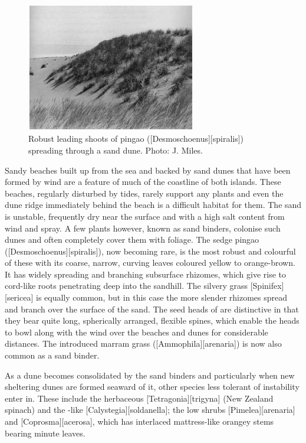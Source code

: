 \begin{figure}
	\includegraphics[width=0.66\textwidth]{graphics/figure88pingao.jpg}
	\centering
	\caption[Robust leading shoots of pingao]{Robust leading shoots of pingao ([Desmoschoenus][spiralis]) spreading through a sand dune.
	Photo: J. Miles.}%
	\label{fig:88pingao}
\end{figure}

Sandy beaches built up from the sea and backed by sand dunes that have been formed by wind are a feature of much of the coastline of both islands.
These beaches, regularly disturbed by tides, rarely support any plants and even the dune ridge immediately behind the beach is a difficult habitat for them.
The sand is unstable, frequently dry near the surface and with a high salt content from wind and spray.
A few plants however, known as sand binders, colonise such dunes and often completely cover them with foliage.
The sedge pingao ([Desmoschoenus][spiralis]), now becoming rare, is the most robust and colourful of these with its coarse, narrow, curving leaves coloured yellow to orange-brown.
It has widely spreading and branching subsurface rhizomes, which give rise to cord-like roots penetrating deep into the sandhill.
The silvery grass [Spinifex][sericea] is equally common, but in this case the more slender rhizomes spread and branch over the surface of the sand.
The seed heads of  are distinctive in that they bear quite long, spherically arranged, flexible spines, which enable the heads to bowl along with the wind over the beaches and dunes for considerable distances.
The introduced marram grass ([Ammophila][arenaria]) is now also common as a sand binder.

As a dune becomes consolidated by the sand binders and particularly when new sheltering dunes are formed seaward of it, other species less tolerant of instability enter in.
These include the herbaceous [Tetragonia][trigyna] (New Zealand spinach) and the -like [Calystegia][soldanella]; the low shrubs [Pimelea][arenaria] and [Coprosma][acerosa], which has interlaced mattress-like orangey stems bearing minute leaves.

